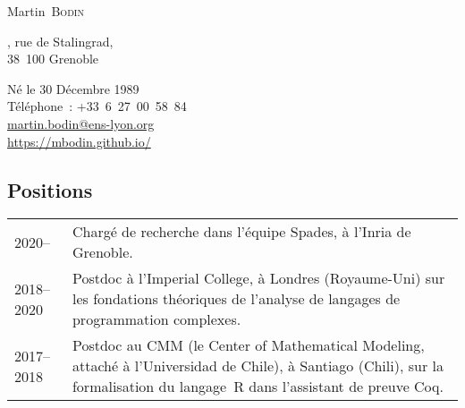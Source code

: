 \documentclass[12pt,a4paper]{article}
\makeatletter
\newcommand{\en}[1]{\foreignlanguage{english}{{#1}}}
\newcommand{\es}[1]{\foreignlanguage{spanish}{{#1}}}
\newcommand{\en}[1]{\foreignlanguage{english}{{#1}}}
\newcommand{\es}[1]{\foreignlanguage{spanish}{{#1}}}
\newenvironment{datecvsection}[1]%
               {\subsection*{#1}%
                 \noindent \begin{tabular}{@{}p{\annee}p{\texte}@{}}}
               {\end{tabular}}
\newcommand\familyName{\textsc}
\newcommand\placeName{}
\makeatother
\begin{document}
\pagestyle{empty}


\newlength{\annee}
\settowidth{\annee}{9999--9999}


\newlength{\texte}
\setlength{\texte}{\textwidth} \addtolength{\texte}{-\annee} 
	\addtolength{\texte}{-2\tabcolsep}

\begin{center} \Huge Martin~\familyName{Bodin} \end{center}

\noindent
\parbox[c]{.5\textwidth}
{
  , rue de Stalingrad, \\
	38~100 Grenoble
}
\parbox[c]{.5\textwidth}
{
\begin{flushright}
  Né le 30 Décembre 1989 \\
  \noindent Téléphone~: \mbox{+33 6 27 00 58 84} \\
  \url{martin.bodin@ens-lyon.org} \\
  \url{https://mbodin.github.io/}
\end{flushright}
}


\begin{datecvsection}{Positions}

		2020– & Chargé de recherche dans l’équipe \placeName{Spades}, à l’\placeName{Inria} de \placeName{Grenoble}. \\

    2018–2020 & Postdoc à l’\en{\placeName{Imperial College}}, à \placeName{Londres} (\placeName{Royaume-Uni}) sur les fondations théoriques de l’analyse de langages de programmation complexes. \\

    2017–2018 & Postdoc au \placeName{CMM} (le \en{\placeName{Center of Mathematical Modeling}}, attaché à l’\es{\placeName{Universidad de Chile}}), à \placeName{Santiago} (\placeName{Chili}), sur la formalisation du langage~R dans l’assistant de preuve Coq. \\

\end{datecvsection}
\end{document}
